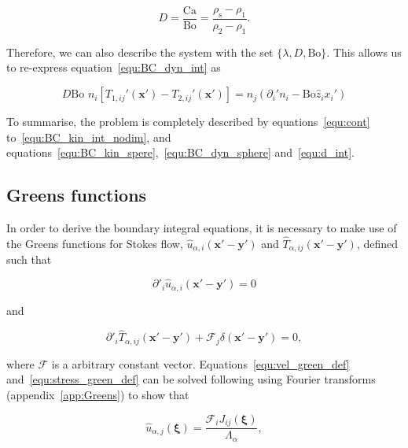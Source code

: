 \documentclass[12pt]{article}
\begin{document}
\begin{equation}
\label{equ:dim_dens_rat}
D = \frac{\text{Ca}}{\text{Bo}} = \frac{\rho_{\text{s}} - \rho_{1}}{\rho_{2} - \rho_{1}}.
\end{equation}

Therefore, we can also describe the system with the set $\{\lambda, D, \text{Bo}\}$. This allows us to re-express equation~\ref{equ:BC_dyn_int} as

\begin{equation}
\label{equ:d_int}
D \text{Bo } n_{i} [T_{1, ij}'(\boldsymbol{x'}) - T_{2, ij}'(\boldsymbol{x'})] = n_{j}(\partial_{i}' n_{i} - \text{Bo} \hat{z}_{i} x_{i}')
\end{equation}

To summarise, the problem is completely described by equations~\ref{equ:cont} to~\ref{equ:BC_kin_int_nodim}, and equations~\ref{equ:BC_kin_spere},~\ref{equ:BC_dyn_sphere} and~\ref{equ:d_int}.


\subsection{Greens functions}
\label{subsec:BIE_deriv}

In order to derive the boundary integral equations, it is necessary to make use of the Greens functions \citep{Riley06} for Stokes flow, $\hat{u}_{\alpha,i}(\boldsymbol{x'} - \boldsymbol{y'})$ and $\hat{T}_{\alpha,ij}(\boldsymbol{x'} - \boldsymbol{y'})$, defined such that

\begin{equation}
\label{equ:vel_green_def}
\partial'_{i} \hat{u}_{\alpha,i}(\boldsymbol{x'} - \boldsymbol{y'}) = 0 
\end{equation}

and

\begin{equation}
\label{equ:stress_green_def}
\partial'_{i} \hat{T}_{\alpha,ij}(\boldsymbol{x'} - \boldsymbol{y'}) + \mathcal{F}_{j} \delta(\boldsymbol{x'} - \boldsymbol{y'}) = 0 , 
\end{equation}

where $\boldsymbol{\mathcal{F}}$ is a arbitrary constant vector. Equations~\ref{equ:vel_green_def} and~\ref{equ:stress_green_def} can be solved following \citet{Ladyzhenskaya63} using Fourier transforms (appendix~\ref{app:Greens}) to show that

\begin{equation}
\label{equ:vel_green}
\hat{u}_{\alpha,j}(\boldsymbol{\xi}) = \frac{\mathcal{F}_{i} J_{ij}(\boldsymbol{\xi})}{\Lambda_{\alpha}} ,
\end{equation}
\end{document}
